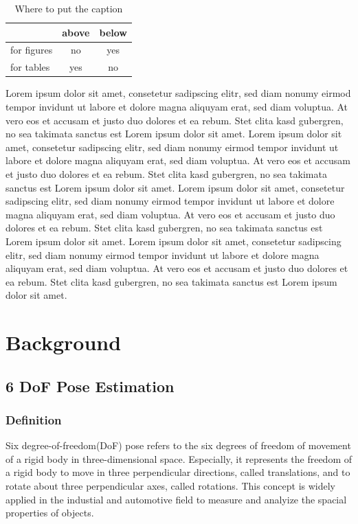 \documentclass[12pt,DIV14,BCOR12mm,a4paper,footinclude=false,headinclude,parskip=half-,twoside,openright,cleardoublepage=empty,toc=index,bibliography=totoc,listof=totoc]{scrreprt}
\numberwithin{equation}{chapter}
\begin{document}
\begin{table}
    \centering
    \caption{Where to put the caption}
    \label{captions}
    \begin{tabular}{lcc}
        \toprule
         & above & below\\
        \midrule
        for figures & no & yes\\
        for tables & yes & no\\
        \bottomrule
    \end{tabular}
\end{table}


Lorem ipsum dolor sit amet, consetetur sadipscing elitr, sed diam nonumy eirmod tempor invidunt ut labore et dolore magna aliquyam erat, sed diam voluptua. At vero eos et accusam et justo duo dolores et ea rebum. Stet clita kasd gubergren, no sea takimata sanctus est Lorem ipsum dolor sit amet. Lorem ipsum dolor sit amet, consetetur sadipscing elitr, sed diam nonumy eirmod tempor invidunt ut labore et dolore magna aliquyam erat, sed diam voluptua. At vero eos et accusam et justo duo dolores et ea rebum. Stet clita kasd gubergren, no sea takimata sanctus est Lorem ipsum dolor sit amet.
\newpage
Lorem ipsum dolor sit amet, consetetur sadipscing elitr, sed diam nonumy eirmod tempor invidunt ut labore et dolore magna aliquyam erat, sed diam voluptua. At vero eos et accusam et justo duo dolores et ea rebum. Stet clita kasd gubergren, no sea takimata sanctus est Lorem ipsum dolor sit amet. Lorem ipsum dolor sit amet, consetetur sadipscing elitr, sed diam nonumy eirmod tempor invidunt ut labore et dolore magna aliquyam erat, sed diam voluptua. At vero eos et accusam et justo duo dolores et ea rebum. Stet clita kasd gubergren, no sea takimata sanctus est Lorem ipsum dolor sit amet.

\chapter{Background}
\section{6 DoF Pose Estimation}
\subsection{Definition}
Six degree-of-freedom(DoF) pose refers to the six degrees of freedom of movement of a rigid body in three-dimensional space. 
Especially, it represents the freedom of a rigid body to move in three perpendicular directions, called translations, and to rotate about three perpendicular axes, 
called rotations. This concept is widely applied in the industial and automotive field to measure and analyize the spacial properties of objects.
\end{document}
